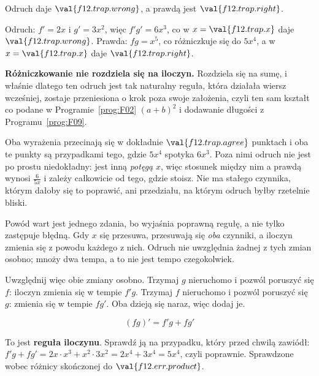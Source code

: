 \begin{fr}
\begin{ansblock}
Odruch daje $\val{f12.trap.wrong}$, a prawdą jest $\val{f12.trap.right}$.
\end{ansblock}

Odruch: $f' = 2x$ i $g' = 3x^{2}$, więc $f'g' = 6x^{3}$, co w
$x = \val{f12.trap.x}$ daje $\val{f12.trap.wrong}$. Prawda: $fg = x^{5}$, co
różniczkuje się do $5x^{4}$, a w $x = \val{f12.trap.x}$ daje
$\val{f12.trap.right}$.

\begin{trapbox}
\textbf{Różniczkowanie nie rozdziela się na iloczyn.} Rozdziela się na sumę, i
właśnie dlatego ten odruch jest tak naturalny \dash{} reguła, która działała
wiersz wcześniej, zostaje przeniesiona o krok poza swoje założenia, czyli ten
sam kształt co podane w Programie~\ref{prog:F02} $(a+b)^{2}$ i dodawanie
długości z Programu~\ref{prog:F09}.

Oba wyrażenia przecinają się w dokładnie $\val{f12.trap.agree}$ punktach i
oba te punkty są przypadkami tego, gdzie $5x^{4}$ spotyka $6x^{3}$. Poza nimi
odruch nie jest po prostu niedokładny: jest inną \emph{potęgą} $x$, więc
stosunek między nim a prawdą wynosi $\frac{6}{5x}$ i zależy całkowicie od
tego, gdzie stoisz. Nie ma stałego czynnika, którym dałoby się to poprawić,
ani przedziału, na którym odruch byłby rzetelnie bliski.

Powód wart jest jednego zdania, bo wyjaśnia poprawną regułę, a nie tylko
zastępuje błędną. Gdy $x$ się przesuwa, przesuwają się \emph{oba} czynniki, a
iloczyn zmienia się z powodu każdego z nich. Odruch nie uwzględnia żadnej z
tych zmian osobno; mnoży dwa tempa, a to nie jest tempo czegokolwiek.
\end{trapbox}
\end{fr}

\begin{fr}
Uwzględnij więc obie zmiany osobno. Trzymaj $g$ nieruchomo i pozwól poruszyć
się $f$: iloczyn zmienia się w tempie $f'g$. Trzymaj $f$ nieruchomo i pozwól
poruszyć się $g$: zmienia się w tempie $fg'$. Oba dzieją się naraz, więc
dodaj je.

\[ (fg)' = f'g + fg' \]

To jest \textbf{reguła iloczynu}. Sprawdź ją na przypadku, który przed chwilą
zawiódł: $f'g + fg' = 2x \cdot x^{3} + x^{2} \cdot 3x^{2} = 2x^{4} + 3x^{4} =
5x^{4}$, czyli poprawnie. Sprawdzone wobec różnicy skończonej do
$\val{f12.err.product}$.

\end{fr}

